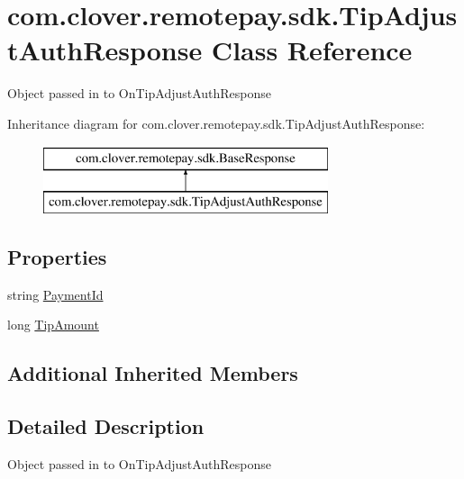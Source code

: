 \hypertarget{classcom_1_1clover_1_1remotepay_1_1sdk_1_1_tip_adjust_auth_response}{}\section{com.\+clover.\+remotepay.\+sdk.\+Tip\+Adjust\+Auth\+Response Class Reference}
\label{classcom_1_1clover_1_1remotepay_1_1sdk_1_1_tip_adjust_auth_response}


Object passed in to On\+Tip\+Adjust\+Auth\+Response  


Inheritance diagram for com.\+clover.\+remotepay.\+sdk.\+Tip\+Adjust\+Auth\+Response\+:\begin{figure}[H]
\begin{center}
\leavevmode
\includegraphics[height=2.000000cm]{classcom_1_1clover_1_1remotepay_1_1sdk_1_1_tip_adjust_auth_response}
\end{center}
\end{figure}
\subsection*{Properties}
\begin{DoxyCompactItemize}
\item 
string \hyperlink{classcom_1_1clover_1_1remotepay_1_1sdk_1_1_tip_adjust_auth_response_ab7f05ccc65c77b1a91f43431f8422851}{Payment\+Id}
\item 
long \hyperlink{classcom_1_1clover_1_1remotepay_1_1sdk_1_1_tip_adjust_auth_response_aa4bcc6cfb9fd980903b4ddb3f0a33be2}{Tip\+Amount}
\end{DoxyCompactItemize}
\subsection*{Additional Inherited Members}


\subsection{Detailed Description}
Object passed in to On\+Tip\+Adjust\+Auth\+Response 



